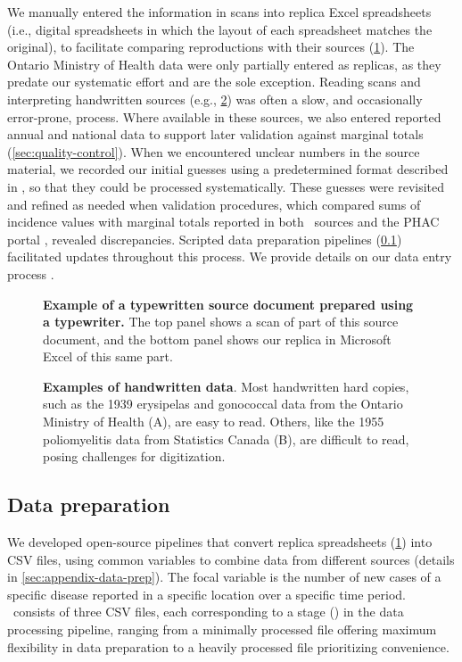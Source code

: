 \documentclass[12pt]{article}
\begin{document}
We manually entered the information in scans into replica Excel spreadsheets (i.e., digital spreadsheets in which the layout of each spreadsheet matches the original), to facilitate comparing reproductions with their sources (\cref{fig:typewritten-eg}). The Ontario Ministry of Health data were only partially entered as replicas, as they predate our systematic effort and are the sole exception. Reading scans and interpreting handwritten sources (e.g., \cref{fig:handwritten-eg}) was often a slow, and occasionally error-prone, process. Where available in these sources, we also entered reported annual and national data to support later validation against marginal totals (\cref{sec:quality-control}). When we encountered unclear numbers in the source material, we recorded our initial guesses using a predetermined format described in , so that they could be processed systematically. These guesses were revisited and refined as needed when validation procedures, which compared sums of incidence values with marginal totals reported in both \datacronym\ sources and the PHAC portal \cite{totten2019updates}, revealed discrepancies. Scripted data preparation pipelines (\cref{sec:data-prep}) facilitated updates throughout this process. We provide details on our data entry process .

\begin{figure}[!htb]
\caption{\textbf{Example of a typewritten source document prepared using a typewriter.} The top panel shows a scan of part of this source document, and the bottom panel shows our replica in Microsoft Excel of this same part.}
\label{fig:typewritten-eg}
\end{figure}

\begin{figure}[!htb]
\caption{\textbf{Examples of handwritten data}. Most handwritten hard copies, such as the 1939 erysipelas and gonococcal data from the Ontario Ministry of Health (A), are easy to read. Others, like the 1955 poliomyelitis data from Statistics Canada (B), are difficult to read, posing challenges for digitization.}
\label{fig:handwritten-eg}
\end{figure}

\subsection{Data preparation}\label{sec:data-prep}

We developed open-source \cite{thibault2023open} pipelines that convert replica spreadsheets (\cref{fig:typewritten-eg}) into CSV files, using common variables to combine data from different sources (details in \cref{sec:appendix-data-prep}). The focal variable is the number of new cases of a specific disease reported in a specific location over a specific time period. \datacronym\ consists of three CSV files, each corresponding to a stage () in the data processing pipeline, ranging from a minimally processed file offering maximum flexibility in data preparation to a heavily processed file prioritizing convenience.
\end{document}
